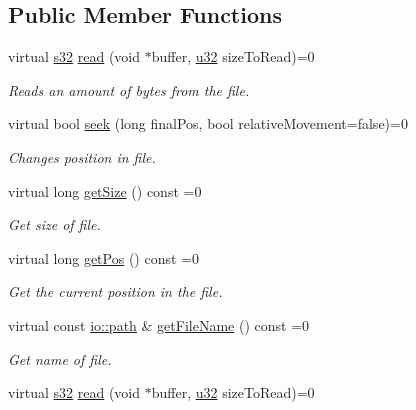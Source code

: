 \subsection*{Public Member Functions}
\begin{DoxyCompactItemize}
\item 
virtual \hyperlink{namespaceirr_ac66849b7a6ed16e30ebede579f9b47c6}{s32} \hyperlink{classirr_1_1io_1_1IReadFile_ab51878d36bc9dd3964b664055fbeb13f}{read} (void $\ast$buffer, \hyperlink{namespaceirr_a0416a53257075833e7002efd0a18e804}{u32} size\+To\+Read)=0
\begin{DoxyCompactList}\small\item\em Reads an amount of bytes from the file. \end{DoxyCompactList}\item 
virtual bool \hyperlink{classirr_1_1io_1_1IReadFile_ac1cd81f18832e8703838d7abd495bf34}{seek} (long final\+Pos, bool relative\+Movement=false)=0
\begin{DoxyCompactList}\small\item\em Changes position in file. \end{DoxyCompactList}\item 
virtual long \hyperlink{classirr_1_1io_1_1IReadFile_a9c64fca7f1d665d7e458cd7d766c35a2}{get\+Size} () const =0
\begin{DoxyCompactList}\small\item\em Get size of file. \end{DoxyCompactList}\item 
virtual long \hyperlink{classirr_1_1io_1_1IReadFile_aeee143ee38871c30f240c025b100941d}{get\+Pos} () const =0
\begin{DoxyCompactList}\small\item\em Get the current position in the file. \end{DoxyCompactList}\item 
virtual const \hyperlink{namespaceirr_1_1io_a6468281622ce3a1c46b72e19f32dded5}{io\+::path} \& \hyperlink{classirr_1_1io_1_1IReadFile_a73b9c884319d2e4b0ff9a7ea15cbf316}{get\+File\+Name} () const =0
\begin{DoxyCompactList}\small\item\em Get name of file. \end{DoxyCompactList}\item 
virtual \hyperlink{namespaceirr_ac66849b7a6ed16e30ebede579f9b47c6}{s32} \hyperlink{classirr_1_1io_1_1IReadFile_ab51878d36bc9dd3964b664055fbeb13f}{read} (void $\ast$buffer, \hyperlink{namespaceirr_a0416a53257075833e7002efd0a18e804}{u32} size\+To\+Read)=0

\end{DoxyCompactItemize}
